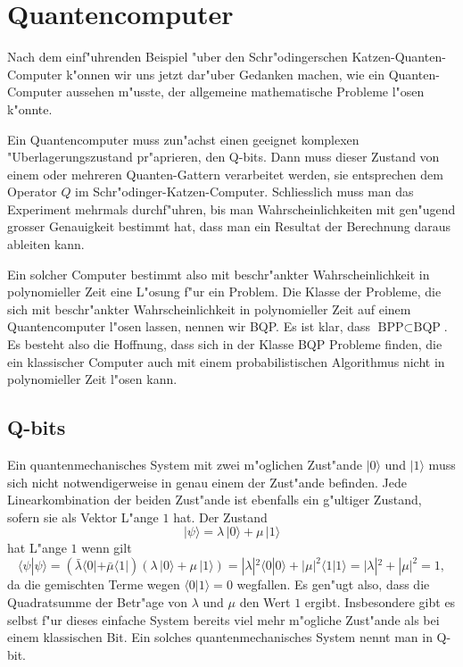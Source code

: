 \section{Quantencomputer}
Nach dem einf"uhrenden Beispiel "uber den Schr"odingerschen
Katzen-Quanten-Computer k"onnen wir uns jetzt dar"uber Gedanken
machen, wie ein Quanten-Computer aussehen m"usste, der allgemeine
mathematische Probleme l"osen k"onnte.

Ein Quantencomputer muss zun"achst einen geeignet komplexen
"Uberlagerungszustand pr"aprieren, den Q-bits. Dann muss dieser Zustand
von einem oder mehreren Quanten-Gattern verarbeitet werden, sie
entsprechen dem Operator $Q$ im Schr"odinger-Katzen-Computer.
Schliesslich muss man das Experiment mehrmals durchf"uhren, bis man
Wahrscheinlichkeiten mit gen"ugend grosser Genauigkeit bestimmt hat,
dass man ein Resultat der Berechnung daraus ableiten kann.

Ein solcher Computer bestimmt also mit beschr"ankter Wahrscheinlichkeit
in polynomieller Zeit eine L"osung f"ur ein Problem. Die
Klasse der Probleme, die sich mit beschr"ankter Wahrscheinlichkeit in
polynomieller Zeit auf einem Quantencomputer l"osen lassen, nennen wir
BQP.
Es ist klar, dass $\text{BPP}\subset\text{BQP}$.
Es besteht also die Hoffnung, dass sich in der Klasse BQP Probleme finden,
die ein klassischer Computer auch mit einem probabilistischen Algorithmus
nicht in polynomieller Zeit l"osen kann.

\subsection{Q-bits}
Ein quantenmechanisches System mit zwei m"oglichen Zust"ande $|0\rangle$
und $|1\rangle$ muss sich nicht
notwendigerweise in genau einem der Zust"ande befinden.
Jede Linearkombination der beiden Zust"ande ist ebenfalls ein g"ultiger
Zustand, sofern sie als Vektor L"ange $1$ hat.
Der Zustand
\[
|\psi\rangle
=
\lambda \,|0\rangle + \mu\,|1\rangle
\]
hat L"ange $1$ wenn gilt
\[
\langle\psi|\psi\rangle
=
(
\bar\lambda
\langle 0|
+
\bar\mu
\langle 1|
)
(
\lambda \,|0\rangle + \mu\,|1\rangle
)
=
|\lambda|^2\langle 0|0\rangle + |\mu|^2\langle 1|1\rangle
=
|\lambda|^2+|\mu|^2
=
1
,
\]
da die gemischten Terme wegen $\langle 0|1\rangle=0$ wegfallen.
Es gen"ugt also, dass die Quadratsumme der Betr"age von $\lambda$ und $\mu$
den Wert $1$ ergibt.
Insbesondere gibt es selbst f"ur dieses einfache System bereits viel
mehr m"ogliche Zust"ande als bei einem klassischen Bit.
Ein solches quantenmechanisches System nennt man in Q-bit.

